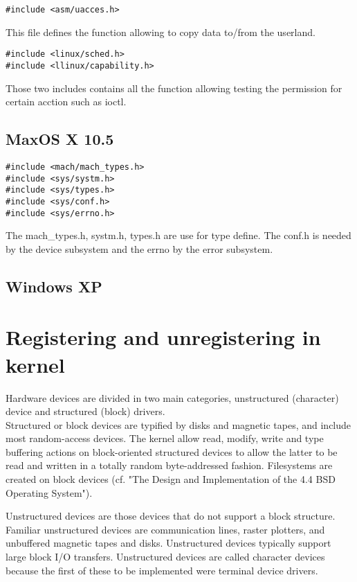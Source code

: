 \documentclass[11pt]{report}
\begin{document}
\begin{lstlisting}
#include <asm/uacces.h>
\end{lstlisting}
This file defines the function allowing to copy data to/from the userland.

\begin{lstlisting}
#include <linux/sched.h>
#include <llinux/capability.h>
\end{lstlisting}
Those two includes contains all the function allowing testing the permission for certain acction such as ioctl.

\subsection{MaxOS X 10.5}
\begin{lstlisting}
#include <mach/mach_types.h>
#include <sys/systm.h>
#include <sys/types.h>
#include <sys/conf.h>
#include <sys/errno.h>
\end{lstlisting}
The mach\_types.h, systm.h, types.h are use for type define. The conf.h is needed by
the device subsystem and the errno by the error subsystem.
\subsection{Windows XP}

\section{Registering and unregistering in kernel}

Hardware devices are divided in two main categories, unstructured (character)
device and structured (block) drivers.\\

Structured or block devices are typified by disks and magnetic tapes, and include
most random-access devices. The kernel allow read, modify, write and type buffering
actions on block-oriented structured devices to allow the latter to be read and written
in a totally random byte-addressed fashion. Filesystems are created on block devices
(cf. "The Design and Implementation of the 4.4 BSD Operating System").

Unstructured devices are those devices that do not support a block structure.
Familiar unstructured devices are communication lines, raster plotters, and unbuffered
magnetic tapes and disks. Unstructured devices typically support large block I/O
transfers. Unstructured devices are called character devices because the first of these
to be implemented were terminal device drivers.\\
\end{document}
